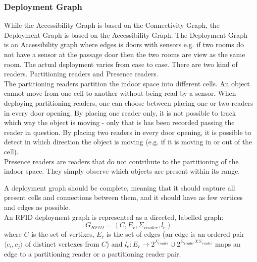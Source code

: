 
\subsubsection{ \quad Deployment Graph}
While the Accessibility Graph is based on the Connectivity Graph, the Deployment Graph is based on the Accessibility Graph. 
The Deployment Graph is an Accessibility graph where edges is doors with sensors e.g. if two rooms do not have a sensor at the passage door then the two rooms are view as the same room.
The actual deployment varies from case to case. 
There are two kind of readers. 
Partitioning readers and Presence readers. \\

The partitioning readers partition the indoor space into different cells. 
An object cannot move from one cell to another without being read by a sensor. 
When deploying partitioning readers, one can choose between placing one or two readers in every door opening. 
By placing one reader only, it is not possible to track which way the object is moving - only that is has been recorded passing the reader in question. 
By placing two readers in every door opening, it is possible to detect in which direction the object is moving (e.g. if it is moving in or out of the cell). \\

Presence readers are readers that do not contribute to the partitioning of the indoor space. 
They simply observe which objects are present within its range. 

A deployment graph should be complete, meaning that it should capture all present cells and connections between them, and it should have as few vertices and edges as possible. \\
An RFID deployment graph is represented as a directed, labelled graph:
\begin{equation}
G_{RFID} = (C, E_r, \Sigma_{reader}, l_e)
\end{equation} 
where $C$ is the set of vertixes, $E_r$ is the set of edges (an edge is an ordered pair $\langle c_i, c_j \rangle$ of distinct vertexes from $C$) and $l_e : E_r \rightarrow 2^{\Sigma_{reader}} \cup 2^{\Sigma_{reader} X \Sigma_{reader}}$ maps an edge to a partitioning reader or a partitioning reader pair. \\

